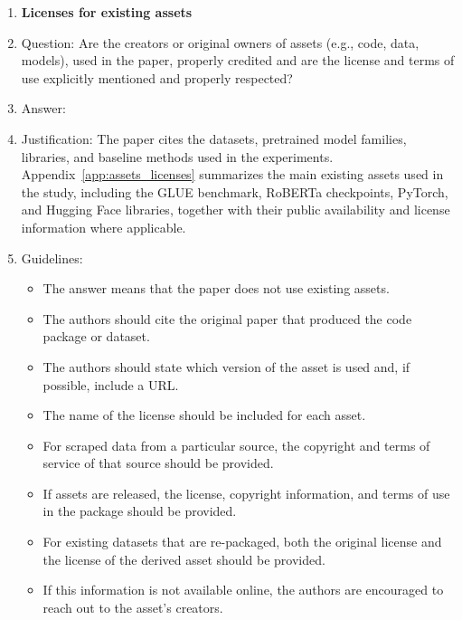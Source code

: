 \begin{enumerate}
\item {\bf Licenses for existing assets}
    \item[] Question: Are the creators or original owners of assets (e.g., code, data, models), used in the paper, properly credited and are the license and terms of use explicitly mentioned and properly respected?
    \item[] Answer: \answerYes{}
    \item[] Justification: The paper cites the datasets, pretrained model families, libraries, and baseline methods used in the experiments. Appendix~\ref{app:assets_licenses} summarizes the main existing assets used in the study, including the GLUE benchmark, RoBERTa checkpoints, PyTorch, and Hugging Face libraries, together with their public availability and license information where applicable.
    \item[] Guidelines:
    \begin{itemize}
        \item The answer \answerNA{} means that the paper does not use existing assets.
        \item The authors should cite the original paper that produced the code package or dataset.
        \item The authors should state which version of the asset is used and, if possible, include a URL.
        \item The name of the license should be included for each asset.
        \item For scraped data from a particular source, the copyright and terms of service of that source should be provided.
        \item If assets are released, the license, copyright information, and terms of use in the package should be provided.
        \item For existing datasets that are re-packaged, both the original license and the license of the derived asset should be provided.
        \item If this information is not available online, the authors are encouraged to reach out to the asset's creators.
    \end{itemize}


\end{enumerate}
